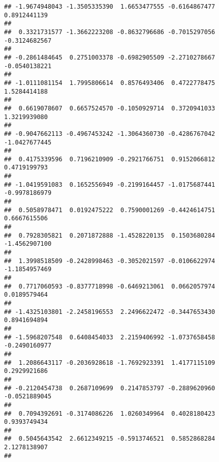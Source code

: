 \documentclass[]{article}
\begin{document}
\begin{verbatim}
## -1.9674948043 -1.3505335390  1.6653477555 -0.6164867477  0.8912441139 
##                                                                       
##  0.3321731577 -1.3662223208 -0.8632796686 -0.7015297056 -0.3124682567 
##                                                                       
## -0.2861484645  0.2751003378 -0.6982905509 -2.2710278667 -0.0540138221 
##                                                                       
## -1.0111081154  1.7995806614  0.8576493406  0.4722778475  1.5284414188 
##                                                                       
##  0.6619078607  0.6657524570 -0.1050929714  0.3720941033  1.3219939080 
##                                                                       
## -0.9047662113 -0.4967453242 -1.3064360730 -0.4286767042 -1.0427677445 
##                                                                       
##  0.4175339596  0.7196210909 -0.2921766751  0.9152066812  0.4719199793 
##                                                                       
## -1.0419591083  0.1652556949 -0.2199164457 -1.0175687441 -0.9978186979 
##                                                                       
##  0.5058978471  0.0192475222  0.7590001269 -0.4424614751  0.6667615506 
##                                                                       
##  0.7928305821  0.2071872888 -1.4528220135  0.1503680284 -1.4562907100 
##                                                                       
##  1.3998518509 -0.2428998463 -0.3052021597 -0.0106622974 -1.1854957469 
##                                                                       
##  0.7717060593 -0.8377718998 -0.6469213061  0.0662057974  0.0189579464 
##                                                                       
## -1.4325103801 -2.2458196553  2.2496622472 -0.3447653430  0.8941694894 
##                                                                       
## -1.5968207548  0.6408454033  2.2159406992 -1.0737658458 -0.2490160977 
##                                                                       
##  1.2086643117 -0.2036928618 -1.7692923391  1.4177115109  0.2929921686 
##                                                                       
## -0.2120454738  0.2687109699  0.2147853797 -0.2889620960 -0.0521889045 
##                                                                       
##  0.7094392691 -0.3174086226  1.0260349964  0.4028180423  0.9393749434 
##                                                                       
##  0.5045643542  2.6612349215 -0.5913746521  0.5852868284  2.1278138907 
##                                                                       

\end{verbatim}
\end{document}
